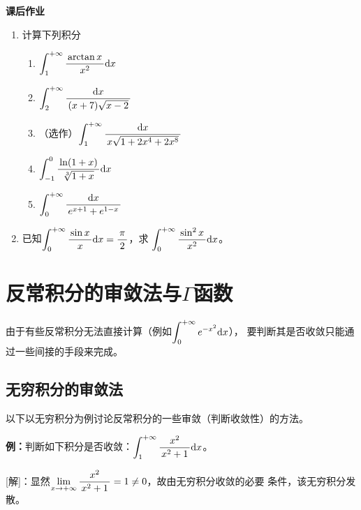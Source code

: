 \begin{ext}
	{\bf 课后作业}	
	\begin{enumerate}
	  \item 计算下列积分
	  \begin{enumerate}[(1)]
	    \item $\dint_1^{+\infty}\df{\arctan x}{x^2}\d x$
	    \item $\dint_2^{+\infty}\df{\d x}{(x+7)\sqrt{x-2}}$
	    \item （选作）$\dint_1^{+\infty}\df{\d x}{x\sqrt{1+2x^4+2x^8}}$
	    \item $\dint_{-1}^0\df{\ln(1+x)}{\sqrt[3]{1+x}}\d x$
	    \item $\dint_0^{+\infty}\df{\d x}{e^{x+1}+e^{1-x}}$
	  \end{enumerate}
	  \item 已知$\dint_0^{+\infty}\df{\sin x}x\d x=\df{\pi}2$，求
	  $\dint_0^{+\infty}\df{\sin^2x}{x^2}\d x$。
	\end{enumerate}
\end{ext}

\section{反常积分的审敛法与$\Gamma$函数}

由于有些反常积分无法直接计算（例如$\dint_0^{+\infty}e^{-x^2}\d x$），
要判断其是否收敛只能通过一些间接的手段来完成。

\subsection{无穷积分的审敛法}

以下以无穷积分为例讨论反常积分的一些审敛（判断收敛性）的方法。

% 
% 

{\bf 例：}判断如下积分是否收敛：$\dint_1^{+\infty}\df{x^2}{x^2+1}\d x$。

[解]：显然$\limx{+\infty}\df{x^2}{x^2+1}=1\ne 0$，故由无穷积分收敛的必要
条件，该无穷积分发散。\fin

